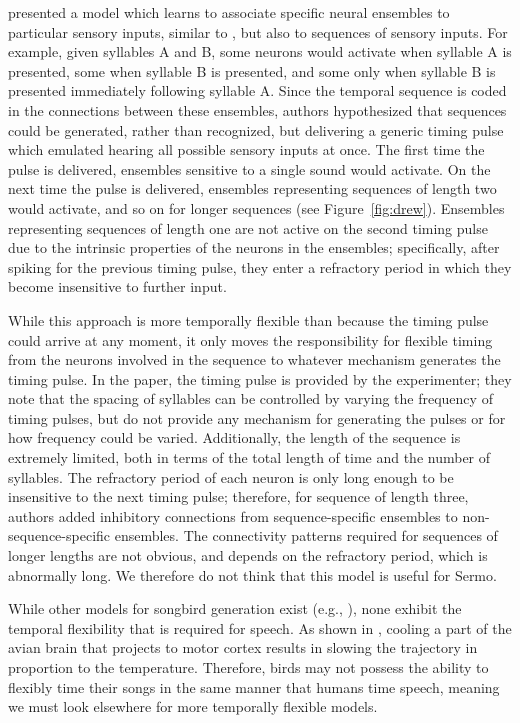 \cite{drew2003} presented a model
which learns to associate specific neural ensembles
to particular sensory inputs,
similar to \cite{troyer2000},
but also to sequences of sensory inputs.
For example, given syllables A and B,
some neurons would activate
when syllable A is presented,
some when syllable B is presented,
and some only when syllable B is presented
immediately following syllable A.
Since the temporal sequence is
coded in the connections between
these ensembles,
\citeauthor{drew2003} authors hypothesized that
sequences could be generated,
rather than recognized,
but delivering a generic timing pulse
which emulated hearing all possible sensory
inputs at once.
The first time the pulse is delivered,
ensembles sensitive to a single sound
would activate.
On the next time the pulse is delivered,
ensembles representing sequences of length two
would activate, and so on for longer sequences
(see Figure~\ref{fig:drew}).
Ensembles representing sequences of length one
are not active on the second timing pulse
due to the intrinsic properties
of the neurons in the ensembles;
specifically, after spiking
for the previous timing pulse,
they enter a refractory period
in which they become insensitive to further input.


While this approach is more temporally flexible
than \cite{troyer2000} because
the timing pulse could arrive at any moment,
it only moves the responsibility for flexible timing
from the neurons involved in the sequence
to whatever mechanism generates the timing pulse.
In the paper, the timing pulse is provided
by the experimenter;
they note that the spacing of syllables
can be controlled by varying the frequency
of timing pulses,
but do not provide any mechanism
for generating the pulses
or for how frequency could be varied.
Additionally, the length of the sequence
is extremely limited,
both in terms of the total length of time
and the number of syllables.
The refractory period of each neuron
is only long enough to be insensitive
to the next timing pulse;
therefore, for sequence of length three,
\citeauthor{drew2003} authors added inhibitory connections
from sequence-specific ensembles
to non-sequence-specific ensembles.
The connectivity patterns required
for sequences of longer lengths
are not obvious,
and depends on the refractory period,
which is abnormally long.
We therefore do not think that
this model is useful for Sermo.

While other models for songbird generation exist
(e.g., \cite{fee2004}),
none exhibit the temporal flexibility
that is required for speech.
As shown in \cite{fee2010},
cooling a part of the avian brain
that projects to motor cortex
results in slowing the trajectory
in proportion to the temperature.
Therefore, birds may not possess
the ability to flexibly time their songs
in the same manner that humans time speech,
meaning we must look elsewhere for
more temporally flexible models.

